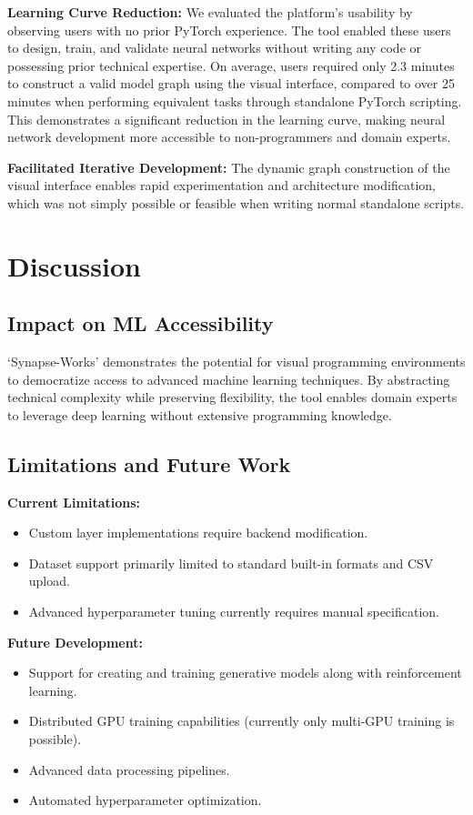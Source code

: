 \documentclass[10pt,conference]{IEEEtran}
\begin{document}
\textbf{Learning Curve Reduction:} We evaluated the platform's usability by observing users with no prior PyTorch experience. The tool enabled these users to design, train, and validate neural networks without writing any code or possessing prior technical expertise. On average, users required only 2.3 minutes to construct a valid model graph using the visual interface, compared to over 25 minutes when performing equivalent tasks through standalone PyTorch scripting. This demonstrates a significant reduction in the learning curve, making neural network development more accessible to non-programmers and domain experts.

\textbf{Facilitated Iterative Development:} The dynamic graph construction of the visual interface enables rapid experimentation and architecture modification, which was not simply possible or feasible when writing normal standalone scripts.

\section{Discussion}
\subsection{Impact on ML Accessibility}
`Synapse-Works' demonstrates the potential for visual programming environments to democratize access to advanced machine learning techniques. By abstracting technical complexity while preserving flexibility, the tool enables domain experts to leverage deep learning without extensive programming knowledge.

\subsection{Limitations and Future Work}
\textbf{Current Limitations:}
\begin{itemize}
    \item Custom layer implementations require backend modification.
    \item Dataset support primarily limited to standard built-in formats and CSV upload.
    \item Advanced hyperparameter tuning currently requires manual specification.
\end{itemize}

\textbf{Future Development:}
\begin{itemize}
    \item Support for creating and training generative models along with reinforcement
          learning.
    \item Distributed GPU training capabilities (currently only multi-GPU training is
          possible).
    \item Advanced data processing pipelines.
    \item Automated hyperparameter optimization.
\end{itemize}
\end{document}
